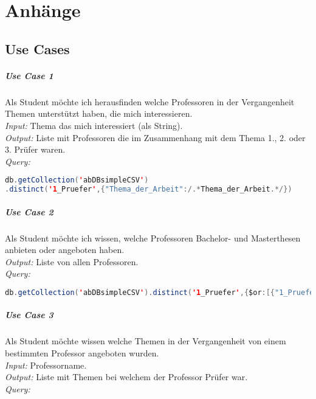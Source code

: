 \chapter{Anhänge}
\section{Use Cases}\label{use_cases}

\paragraph{Use Case 1} Als Student möchte ich herausfinden welche Professoren in der Vergangenheit Themen unterstützt haben, die mich interessieren. \\
\emph{Input:} Thema das mich interessiert (als String). \\
\emph{Output:} Liste mit Professoren die im Zusammenhang mit dem Thema 1., 2. oder 3. Prüfer waren. \\
\emph{Query:}

\begin{lstlisting}[caption={Query zu Use Case 1},language=java,captionpos=t,numbers=none, numberstyle=\tiny,breaklines=true]
db.getCollection('abDBsimpleCSV')
.distinct('1_Pruefer',{"Thema_der_Arbeit":/.*Thema_der_Arbeit.*/})
\end{lstlisting}\label{lst:query1}

\paragraph{Use Case 2} Als Student möchte ich wissen, welche Professoren Bachelor- und Masterthesen anbieten oder angeboten haben. \\
\emph{Output:} Liste von allen Professoren. \\
\emph{Query:}

\begin{lstlisting}[caption={Query zu Use Case 2},language=java,captionpos=t,numbers=none, numberstyle=\tiny,breaklines=true]
db.getCollection('abDBsimpleCSV').distinct('1_Pruefer',{$or:[{"1_Pruefer":{$ne:""}},{"2_Pruefer":{$ne:""}},{"3_Pruefer":{$ne:""}}]})
\end{lstlisting}\label{lst:query2}

\paragraph{Use Case 3} Als Student möchte wissen welche Themen in der Vergangenheit von einem bestimmten Professor angeboten wurden. \\
\emph{Input:} Professorname. \\
\emph{Output:} Liste mit Themen bei welchem der Professor Prüfer war. \\
\emph{Query:}

